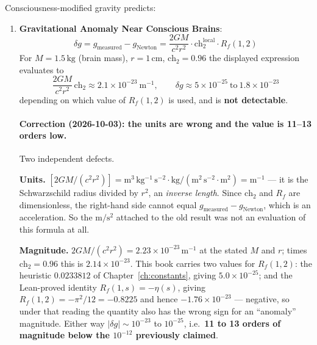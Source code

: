 \begin{proposition}\label{prop:lab-tests}
Consciousness-modified gravity predicts:

\begin{enumerate}
\item \textbf{Gravitational Anomaly Near Conscious Brains}:
\begin{equation}
\delta g = g_{\text{measured}} - g_{\text{Newton}} = \frac{2GM}{c^2r^2} \cdot \text{ch}_2^{\text{local}} \cdot R_f(1,2)
\end{equation}
For $M = 1.5 \, \text{kg}$ (brain mass), $r = 1 \, \text{cm}$, $\text{ch}_2 = 0.96$
the displayed expression evaluates to
\begin{equation}
\frac{2GM}{c^2r^2}\,\text{ch}_2 \approx 2.1 \times 10^{-23}\ \mathrm{m^{-1}},
\qquad
\delta g \approx 5 \times 10^{-25} \ \text{to}\ 1.8 \times 10^{-23}
\end{equation}
depending on which value of $R_f(1,2)$ is used, and is \textbf{not detectable}.

\paragraph{Correction (2026-10-03): the units are wrong and the value is 11--13 orders low.}
Two independent defects.

\textbf{Units.} $[2GM/(c^2r^2)] =
\mathrm{m^3\,kg^{-1}\,s^{-2}} \cdot \mathrm{kg} / (\mathrm{m^2\,s^{-2}} \cdot \mathrm{m^2})
= \mathrm{m^{-1}}$ --- it is the Schwarzschild radius divided by $r^2$, an
\emph{inverse length}. Since $\text{ch}_2$ and $R_f$ are dimensionless, the
right-hand side cannot equal $g_{\text{measured}} - g_{\text{Newton}}$, which is
an acceleration. So the $\mathrm{m/s^2}$ attached to the old result was not an
evaluation of this formula at all.

\textbf{Magnitude.} $2GM/(c^2r^2) = 2.23\times10^{-23}\,\mathrm{m^{-1}}$ at the
stated $M$ and $r$; times $\text{ch}_2 = 0.96$ this is
$2.14\times10^{-23}$. This book carries two values for $R_f(1,2)$: the heuristic
$0.0233812$ of Chapter~\ref{ch:constants}, giving $5.0\times10^{-25}$; and the
Lean-proved identity $R_f(1,s) = -\eta(s)$, giving
$R_f(1,2) = -\pi^2/12 = -0.8225$ and hence $-1.76\times10^{-23}$ --- negative, so
under that reading the quantity also has the wrong sign for an ``anomaly''
magnitude. Either way $|\delta g| \sim 10^{-23}$ to $10^{-25}$, i.e.\
\textbf{11 to 13 orders of magnitude below the $10^{-12}$ previously claimed}.


\end{enumerate}
\end{proposition}
